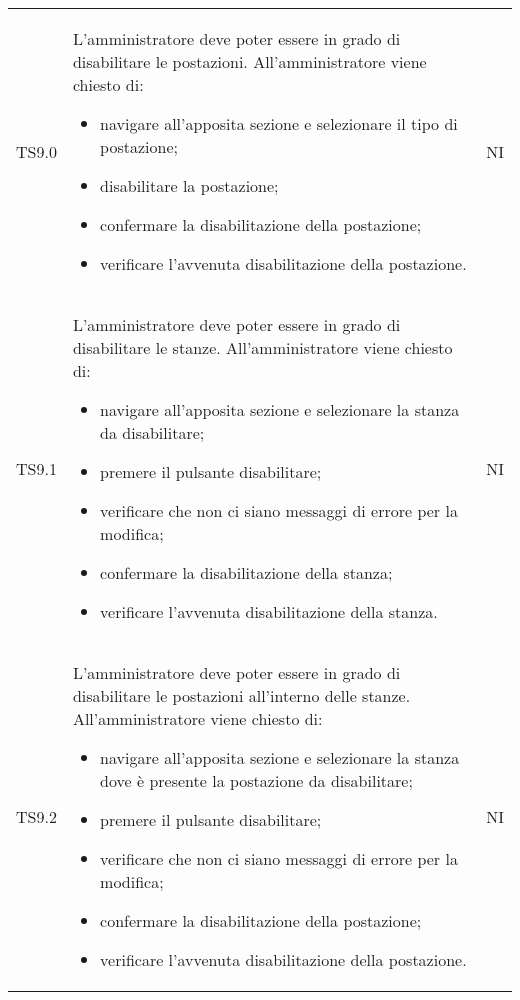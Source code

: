{\begin{longtable}{ c C{11cm} c }
        TS9.0&
        L'amministratore deve poter essere in grado di disabilitare le postazioni.\newline
        All'amministratore viene chiesto di:
        \begin{itemize}
            \item navigare all'apposita sezione e selezionare il tipo di postazione;
            \item disabilitare la postazione;
            \item confermare la disabilitazione della postazione;
            \item verificare l'avvenuta disabilitazione della postazione.
        \end{itemize}&
        NI\\

        TS9.1&
        L'amministratore deve poter essere in grado di disabilitare le stanze.\newline
        All'amministratore viene chiesto di:
        \begin{itemize}
            \item navigare all'apposita sezione e selezionare la stanza da disabilitare;
            \item premere il pulsante disabilitare;
            \item verificare che non ci siano messaggi di errore per la modifica;
            \item confermare la disabilitazione della stanza;
            \item verificare l'avvenuta disabilitazione della stanza.
        \end{itemize}&
        NI\\

        TS9.2&
        L'amministratore deve poter essere in grado di disabilitare le postazioni all'interno delle stanze.\newline
        All'amministratore viene chiesto di:
        \begin{itemize}
            \item navigare all'apposita sezione e selezionare la stanza dove è presente la postazione da disabilitare;
            \item premere il pulsante disabilitare;
            \item verificare che non ci siano messaggi di errore per la modifica;
            \item confermare la disabilitazione della postazione;
            \item verificare l'avvenuta disabilitazione della postazione.
        \end{itemize}&
        NI\\


\end{longtable}}
